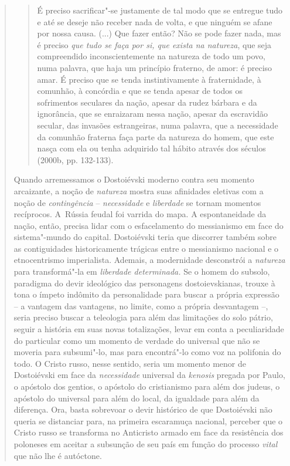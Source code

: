 {\begin{quote}
\begin{quote}
É preciso sacrificar"-se justamente de tal modo que se entregue tudo e
até se deseje não receber nada de volta, e que ninguém se afane por
nossa causa. (...) Que fazer então? Não se pode fazer nada, mas é
preciso \emph{que tudo se faça por si, que exista na natureza}, que seja
compreendido inconscientemente na natureza de todo um povo, numa
palavra, que haja um princípio fraterno, de amor: é preciso amar. É
preciso que se tenda instintivamente à fraternidade, à comunhão, à
concórdia e que se tenda apesar de todos os sofrimentos seculares da
nação, apesar da rudez bárbara e da ignorância, que se enraizaram nessa
nação, apesar da escravidão secular, das invasões estrangeiras, numa
palavra, que a necessidade da comunhão fraterna faça parte da natureza
do homem, que este nasça com ela ou tenha adquirido tal hábito através
dos séculos (2000b, pp. 132-133).
\end{quote}

Quando arremessamos o Dostoiévski moderno contra seu momento arcaizante,
a noção de \emph{natureza} mostra suas afinidades eletivas com a noção
de \emph{contingência} -- \emph{necessidade} e \emph{liberdade} se
tornam momentos recíprocos. A~Rússia feudal foi varrida do mapa. A
espontaneidade da nação, então, precisa lidar com o esfacelamento do
messianismo em face do sistema"-mundo do capital. Dostoiévski teria que
discorrer também sobre as contiguidades historicamente trágicas entre o
messianismo nacional e o etnocentrismo imperialista. Ademais, a
modernidade desconstrói a \emph{natureza} para transformá"-la em
\emph{liberdade determinada.} Se o homem do subsolo, paradigma do devir
ideológico das personagens dostoievskianas, trouxe à tona o ímpeto
indômito da personalidade para buscar a própria expressão -- a vantagem
das vantagens, no limite, como a própria desvantagem --, seria preciso
buscar a teleologia para além das limitações do solo pátrio, seguir a
história em suas novas totalizações, levar em conta a peculiaridade do
particular como um momento de verdade do universal que não se moveria
para subsumi"-lo, mas para encontrá"-lo como voz na polifonia do todo. O
Cristo russo, nesse sentido, seria um momento menor de Dostoiévski em
face da \emph{necessidade} universal da \emph{kenosis} pregada por
Paulo, o apóstolo dos gentios, o apóstolo do cristianismo para além dos
judeus, o apóstolo do universal para além do local, da igualdade para
além da diferença. Ora, basta sobrevoar o devir histórico de que
Dostoiévski não queria se distanciar para, na primeira escaramuça
nacional, perceber que o Cristo russo se transforma no Anticristo armado
em face da resistência dos poloneses em aceitar a subsunção de seu país
em função do processo \emph{vital} que não lhe é autóctone.


\end{quote}}
